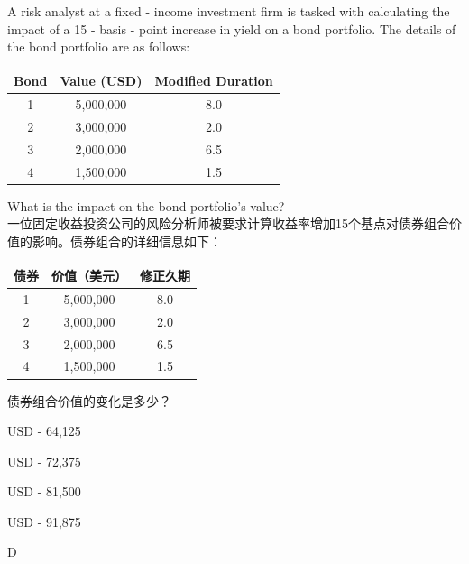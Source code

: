\documentclass{article}
\newcounter{question} %
\begin{document}
\begin{question}
    A risk analyst at a fixed - income investment firm is tasked with calculating the impact of a 15 - basis - point increase in yield on a bond portfolio. The details of the bond portfolio are as follows:
    \begin{center}
    \begin{tabular}{|c|c|c|}
    \hline
    Bond & Value (USD) & Modified Duration \\
    \hline
    1 & 5,000,000 & 8.0 \\
    2 & 3,000,000 & 2.0 \\
    3 & 2,000,000 & 6.5 \\
    4 & 1,500,000 & 1.5 \\
    \hline
    \end{tabular}
    \end{center}
    What is the impact on the bond portfolio's value?
    \\一位固定收益投资公司的风险分析师被要求计算收益率增加15个基点对债券组合价值的影响。债券组合的详细信息如下：
    \begin{center}
    \begin{tabular}{|c|c|c|}
    \hline
    债券 & 价值（美元） & 修正久期\\
    \hline
    1 & 5,000,000 & 8.0 \\
    2 & 3,000,000 & 2.0 \\
    3 & 2,000,000 & 6.5 \\
    4 & 1,500,000 & 1.5 \\
    \hline
    \end{tabular}
    \end{center}
    债券组合价值的变化是多少？
    \end{question}
    
    \begin{choices}
        \item USD - 64,125
        \item USD - 72,375
        \item USD - 81,500
        \item USD - 91,875
    \end{choices}
    
    \begin{correctanswer}
        D
    \end{correctanswer}
    
\end{document}
